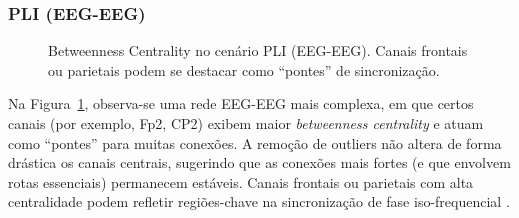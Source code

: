 \subsubsection{PLI (EEG-EEG)}
\begin{figure}[htb]
    \centering
    \quad
    \caption{Betweenness Centrality no cenário PLI (EEG-EEG). Canais frontais ou parietais podem se destacar como “pontes” de sincronização.}
    \label{fig:bc_pli_eegeeg}
\end{figure}

Na Figura~\ref{fig:bc_pli_eegeeg}, observa-se uma rede EEG-EEG mais complexa, em que certos canais (por exemplo, Fp2, CP2) exibem maior \emph{betweenness centrality} e atuam como “pontes” para muitas conexões. A remoção de outliers não altera de forma drástica os canais centrais, sugerindo que as conexões mais fortes (e que envolvem rotas essenciais) permanecem estáveis. Canais frontais ou parietais com alta centralidade podem refletir regiões-chave na sincronização de fase iso-frequencial \cite{rubinov2010complex}.

